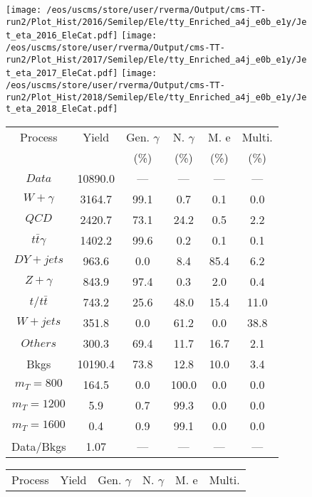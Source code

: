 \begin{figure}
\centering
\texttt{[image: /eos/uscms/store/user/rverma/Output/cms-TT-run2/Plot\_Hist/2016/Semilep/Ele/tty\_Enriched\_a4j\_e0b\_e1y/Jet\_eta\_2016\_EleCat.pdf]}
\texttt{[image: /eos/uscms/store/user/rverma/Output/cms-TT-run2/Plot\_Hist/2017/Semilep/Ele/tty\_Enriched\_a4j\_e0b\_e1y/Jet\_eta\_2017\_EleCat.pdf]}
\texttt{[image: /eos/uscms/store/user/rverma/Output/cms-TT-run2/Plot\_Hist/2018/Semilep/Ele/tty\_Enriched\_a4j\_e0b\_e1y/Jet\_eta\_2018\_EleCat.pdf]}
\begin{minipage}[c]{0.32\textwidth}
\centering
\tiny{
\begin{tabular}{cccccc}
\hline
Process & Yield & Gen. $\gamma$ & N. $\gamma$ & M. e & Multi. \\
 &  & (\%) & (\%) & (\%) & (\%)  \\
\hline
                                                                      $ Data $ &  10890.0 &  --- &  --- &  --- &  ---\\
$ W+\gamma $ &  3164.7 &  99.1 &  0.7 &  0.1 &  0.0\\
$ QCD $ &  2420.7 &  73.1 &  24.2 &  0.5 &  2.2\\
$ t\bar{t}\gamma $ &  1402.2 &  99.6 &  0.2 &  0.1 &  0.1\\
$ DY+jets $ &  963.6 &  0.0 &  8.4 &  85.4 &  6.2\\
$ Z+\gamma $ &  843.9 &  97.4 &  0.3 &  2.0 &  0.4\\
$ t/t\bar{t} $ &  743.2 &  25.6 &  48.0 &  15.4 &  11.0\\
$ W+jets $ &  351.8 &  0.0 &  61.2 &  0.0 &  38.8\\
$ Others $ &  300.3 &  69.4 &  11.7 &  16.7 &  2.1\\
Bkgs &  10190.4 &  73.8 &  12.8 &  10.0 &  3.4\\
$ m_{T} = 800 $ &  164.5 &  0.0 &  100.0 &  0.0 &  0.0\\
$ m_{T} = 1200 $ &  5.9 &  0.7 &  99.3 &  0.0 &  0.0\\
$ m_{T} = 1600 $ &  0.4 &  0.9 &  99.1 &  0.0 &  0.0\\
Data/Bkgs &  1.07 &  --- &  --- &  --- &  ---\\
\hline
\end{tabular}
}
\end{minipage}
\begin{minipage}[c]{0.32\textwidth}
\centering
\tiny{
\begin{tabular}{cccccc}
\hline
Process & Yield & Gen. $\gamma$ & N. $\gamma$ & M. e & Multi. \\

\end{tabular}}
\end{minipage}
\end{figure}
